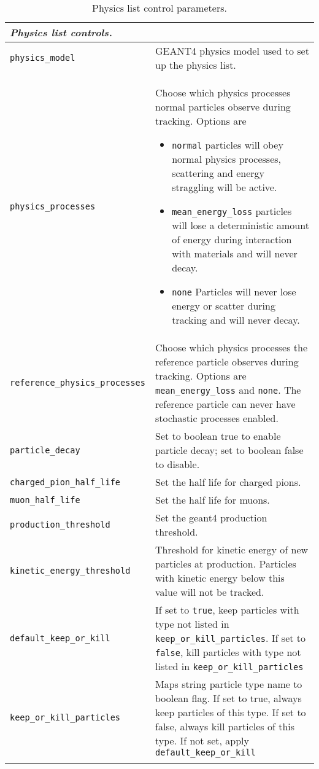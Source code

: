\begin{table*}
\begin{center}
\caption{Physics list control parameters.}
\begin{tabularx}{\textwidth}{lX}
\hline
\multicolumn{2}{l}{\emph{Physics list controls.}} \\
\hline
\verb|physics_model| & GEANT4 physics model used to set up the physics list.\\
\verb|physics_processes| & Choose which physics processes normal particles observe during tracking. Options are 
                            \begin{itemize}
                            \item \verb|normal| particles will obey normal physics processes, scattering and energy straggling will be active.
                            \item \verb|mean_energy_loss| particles will lose a deterministic amount of energy during interaction with materials and will never decay.
                            \item \verb|none| Particles will never lose energy or scatter during tracking and will never decay.
                            \end{itemize} \\
\verb|reference_physics_processes| & Choose which physics processes the reference particle observes during tracking. Options are \verb|mean_energy_loss| and \verb|none|. The reference particle can never have stochastic processes enabled.\\
\verb|particle_decay| & Set to boolean true to enable particle decay; set to boolean false to disable.\\
\verb|charged_pion_half_life| & Set the half life for charged pions.\\
\verb|muon_half_life| & Set the half life for muons.\\
\verb|production_threshold| & Set the geant4 production threshold.\\
\verb|kinetic_energy_threshold| & Threshold for kinetic energy of new particles at production. Particles with kinetic energy below this value will not be tracked.\\
\verb|default_keep_or_kill| & If set to \verb|true|, keep particles with type not listed in \verb|keep_or_kill_particles|. If set to \verb|false|, kill particles with type not listed in \verb|keep_or_kill_particles|\\
\verb|keep_or_kill_particles| & Maps string particle type name to boolean flag. If set to true, always keep particles of this type. If set to false, always kill particles of this type. If not set, apply \verb|default_keep_or_kill|\\
\begin{makeimage} %
\end{makeimage} 
\end{tabularx}
\end{center}
\end{table*}

